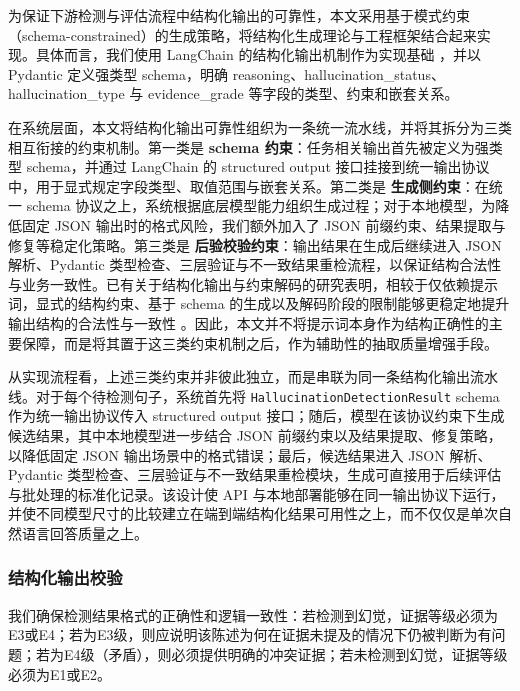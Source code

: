 \documentclass[11pt]{article}
\begin{document}
为保证下游检测与评估流程中结构化输出的可靠性，本文采用基于模式约束（schema-constrained）的生成策略，将结构化生成理论与工程框架结合起来实现。具体而言，我们使用 LangChain 的结构化输出机制作为实现基础 \citep{chase2023langchain,langchain2024structuredOutput}，并以 Pydantic 定义强类型 schema，明确 reasoning、hallucination\_status、hallucination\_type 与 evidence\_grade 等字段的类型、约束和嵌套关系。

在系统层面，本文将结构化输出可靠性组织为一条统一流水线，并将其拆分为三类相互衔接的约束机制。第一类是 \textbf{schema 约束}：任务相关输出首先被定义为强类型 schema，并通过 LangChain 的 structured output 接口挂接到统一输出协议中，用于显式规定字段类型、取值范围与嵌套关系。第二类是 \textbf{生成侧约束}：在统一 schema 协议之上，系统根据底层模型能力组织生成过程；对于本地模型，为降低固定 JSON 输出时的格式风险，我们额外加入了 JSON 前缀约束、结果提取与修复等稳定化策略。第三类是 \textbf{后验校验约束}：输出结果在生成后继续进入 JSON 解析、Pydantic 类型检查、三层验证与不一致结果重检流程，以保证结构合法性与业务一致性。已有关于结构化输出与约束解码的研究表明，相较于仅依赖提示词，显式的结构约束、基于 schema 的生成以及解码阶段的限制能够更稳定地提升输出结构的合法性与一致性 \citep{liu2024structuredOutputBenchmark,lu2025schemaReinforcementLearning,geng2023grammarConstrainedDecoding}。因此，本文并不将提示词本身作为结构正确性的主要保障，而是将其置于这三类约束机制之后，作为辅助性的抽取质量增强手段。

从实现流程看，上述三类约束并非彼此独立，而是串联为同一条结构化输出流水线。对于每个待检测句子，系统首先将 \texttt{HallucinationDetectionResult} schema 作为统一输出协议传入 structured output 接口；随后，模型在该协议约束下生成候选结果，其中本地模型进一步结合 JSON 前缀约束以及结果提取、修复策略，以降低固定 JSON 输出场景中的格式错误；最后，候选结果进入 JSON 解析、Pydantic 类型检查、三层验证与不一致结果重检模块，生成可直接用于后续评估与批处理的标准化记录。该设计使 API 与本地部署能够在同一输出协议下运行，并使不同模型尺寸的比较建立在端到端结构化结果可用性之上，而不仅仅是单次自然语言回答质量之上。

\subsubsection{结构化输出校验}

我们确保检测结果格式的正确性和逻辑一致性：若检测到幻觉，证据等级必须为E3或E4；若为E3级，则应说明该陈述为何在证据未提及的情况下仍被判断为有问题；若为E4级（矛盾），则必须提供明确的冲突证据；若未检测到幻觉，证据等级必须为E1或E2。
\end{document}
